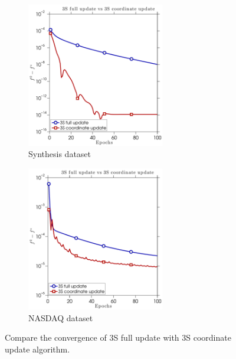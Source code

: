 \begin{figure} \centering
    \begin{subfigure}[b]{0.45\linewidth}
        \includegraphics[width=60mm]{./figs/synth_data_f_err_cropped.pdf}
        \caption{Synthesis dataset}
        \label{fig:a}
    \end{subfigure} %
    \quad
    \begin{subfigure}[b]{0.45\linewidth}
        \includegraphics[width=60mm]{./figs/real_data_f_err_cropped.pdf}
        \caption{NASDAQ dataset}
        \label{fig:a}
    \end{subfigure} %
    \caption{Compare the convergence of 3S full update with 3S coordinate update algorithm.}
    \label{fig:3s_results}
\end{figure}

